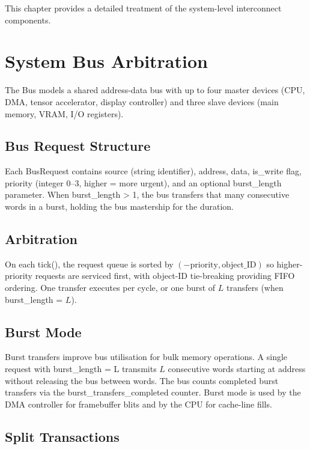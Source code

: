 \documentclass[12pt,a4paper,twoside]{book}
\theoremstyle{trinarytheorem}
\theoremstyle{trinarydefinition}
\newcommand{\code}[1]{\textsf{#1}}
\begin{document}
This chapter provides a detailed treatment of the system-level
interconnect components.

\section{System Bus Arbitration}

The \code{Bus} models a shared address-data bus with up to four
master devices (CPU, DMA, tensor accelerator, display controller)
and three slave devices (main memory, VRAM, I/O registers).

\subsection{Bus Request Structure}

Each \code{BusRequest} contains \code{source} (string identifier),
\code{address}, \code{data}, \code{is\_write} flag,
\code{priority} (integer 0--3, higher = more urgent), and an optional
\code{burst\_length} parameter. When \code{burst\_length > 1}, the bus
transfers that many consecutive words in a burst, holding the bus
mastership for the duration.

\subsection{Arbitration}

On each \code{tick()}, the request queue is sorted by
$(-\text{priority}, \text{object\_ID})$ so higher-priority requests
are serviced first, with object-ID tie-breaking providing FIFO
ordering. One transfer executes per cycle, or one burst of
$L$ transfers (when \code{burst\_length} = $L$).

\subsection{Burst Mode}

Burst transfers improve bus utilisation for bulk memory operations.
A single request with \code{burst\_length = L} transmits $L$ consecutive
words starting at \code{address} without releasing the bus between
words. The bus counts completed burst transfers via the
\code{burst\_transfers\_completed} counter. Burst mode is used by the
DMA controller for framebuffer blits and by the CPU for cache-line fills.

\subsection{Split Transactions}
\end{document}
